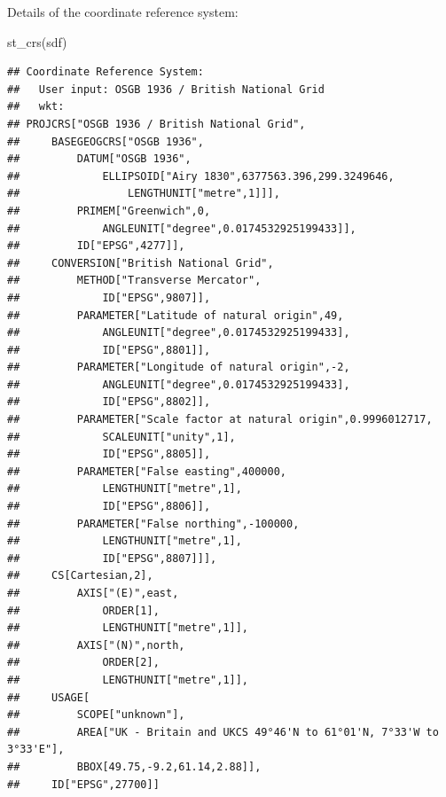 \documentclass[
]{book}
\newenvironment{Shaded}{\begin{snugshade}}{\end{snugshade}}
\newcommand{\FunctionTok}[1]{\textcolor[rgb]{0.00,0.00,0.00}{#1}}
\newcommand{\NormalTok}[1]{#1}
\begin{document}
Details of the coordinate reference system:

\begin{Shaded}
\begin{Highlighting}[]
\FunctionTok{st\_crs}\NormalTok{(sdf)}
\end{Highlighting}
\end{Shaded}

\begin{verbatim}
## Coordinate Reference System:
##   User input: OSGB 1936 / British National Grid 
##   wkt:
## PROJCRS["OSGB 1936 / British National Grid",
##     BASEGEOGCRS["OSGB 1936",
##         DATUM["OSGB 1936",
##             ELLIPSOID["Airy 1830",6377563.396,299.3249646,
##                 LENGTHUNIT["metre",1]]],
##         PRIMEM["Greenwich",0,
##             ANGLEUNIT["degree",0.0174532925199433]],
##         ID["EPSG",4277]],
##     CONVERSION["British National Grid",
##         METHOD["Transverse Mercator",
##             ID["EPSG",9807]],
##         PARAMETER["Latitude of natural origin",49,
##             ANGLEUNIT["degree",0.0174532925199433],
##             ID["EPSG",8801]],
##         PARAMETER["Longitude of natural origin",-2,
##             ANGLEUNIT["degree",0.0174532925199433],
##             ID["EPSG",8802]],
##         PARAMETER["Scale factor at natural origin",0.9996012717,
##             SCALEUNIT["unity",1],
##             ID["EPSG",8805]],
##         PARAMETER["False easting",400000,
##             LENGTHUNIT["metre",1],
##             ID["EPSG",8806]],
##         PARAMETER["False northing",-100000,
##             LENGTHUNIT["metre",1],
##             ID["EPSG",8807]]],
##     CS[Cartesian,2],
##         AXIS["(E)",east,
##             ORDER[1],
##             LENGTHUNIT["metre",1]],
##         AXIS["(N)",north,
##             ORDER[2],
##             LENGTHUNIT["metre",1]],
##     USAGE[
##         SCOPE["unknown"],
##         AREA["UK - Britain and UKCS 49°46'N to 61°01'N, 7°33'W to 3°33'E"],
##         BBOX[49.75,-9.2,61.14,2.88]],
##     ID["EPSG",27700]]
\end{verbatim}

  
\end{document}
